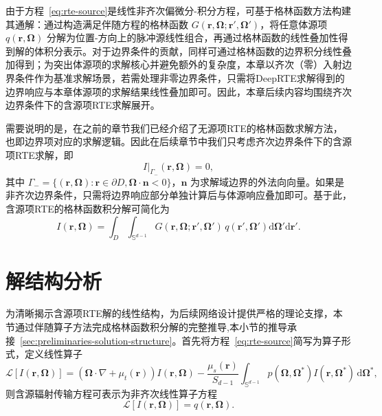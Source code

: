 由于方程~\eqref{eq:rte-source}是线性非齐次偏微分-积分方程，可基于格林函数方法构建其通解：通过构造满足伴随方程的格林函数 $G(\boldsymbol{r},\boldsymbol{\Omega};\boldsymbol{r}',\boldsymbol{\Omega}')$，将任意体源项 $q(\boldsymbol{r},\boldsymbol{\Omega})$ 分解为位置-方向上的脉冲源线性组合，再通过格林函数的线性叠加性得到解的体积分表示。对于边界条件的贡献，同样可通过格林函数的边界积分线性叠加得到；为突出体源项的求解核心并避免额外的复杂度，本章以齐次（零）入射边界条件作为基准求解场景，若需处理非零边界条件，只需将DeepRTE求解得到的边界响应与本章体源项的求解结果线性叠加即可。因此，本章后续内容均围绕齐次边界条件下的含源项RTE求解展开。

需要说明的是，在之前的章节我们已经介绍了无源项RTE的格林函数求解方法，也即边界项对应的求解逻辑。因此在后续章节中我们只考虑齐次边界条件下的含源项RTE求解，即
\begin{equation}
    I|_{\Gamma_{-}}(\boldsymbol{r},\boldsymbol{\Omega}) = 0,
\end{equation}
其中 $\Gamma_{-}=\{(\boldsymbol{r},\boldsymbol{\Omega}):\boldsymbol{r}\in\partial D, \boldsymbol{\Omega}\cdot\boldsymbol{n}<0\}$，$\boldsymbol{n}$ 为求解域边界的外法向向量。如果是非齐次边界条件，只需将边界响应部分单独计算后与体源响应叠加即可。基于此，含源项RTE的格林函数积分解可简化为
\begin{equation}\label{eq:rte-green-source}
    I(\boldsymbol{r},\boldsymbol{\Omega})
    = \int_{D}\int_{\mathbb{S}^{d-1}} G(\boldsymbol{r},\boldsymbol{\Omega};\boldsymbol{r}',\boldsymbol{\Omega}')\, q(\boldsymbol{r}',\boldsymbol{\Omega}')\mathrm{d}\boldsymbol{\Omega}'\mathrm{d}\boldsymbol{r}'.
\end{equation}

\section{解结构分析}

为清晰揭示含源项RTE解的线性结构，为后续网络设计提供严格的理论支撑，本节通过伴随算子方法完成格林函数积分解的完整推导,本小节的推导承接~\ref{sec:preliminaries-solution-structure}。首先将方程~\eqref{eq:rte-source}简写为算子形式，定义线性算子
\begin{equation}
    \mathcal{L}[I(\boldsymbol{r},\boldsymbol{\Omega})]
    = (\boldsymbol{\Omega}\cdot\nabla + \mu_t(\boldsymbol{r})) I(\boldsymbol{r},\boldsymbol{\Omega})
    - \frac{\mu_s(\boldsymbol{r})}{S_{d-1}} \int_{\mathbb{S}^{d-1}} p(\boldsymbol{\Omega},\boldsymbol{\Omega}^*) I(\boldsymbol{r},\boldsymbol{\Omega}^*)\,\mathrm{d}\boldsymbol{\Omega}^*,
\end{equation}
则含源辐射传输方程可表示为非齐次线性算子方程
\begin{equation}
    \mathcal{L}[I(\boldsymbol{r},\boldsymbol{\Omega})] = q(\boldsymbol{r},\boldsymbol{\Omega}).
\end{equation}

